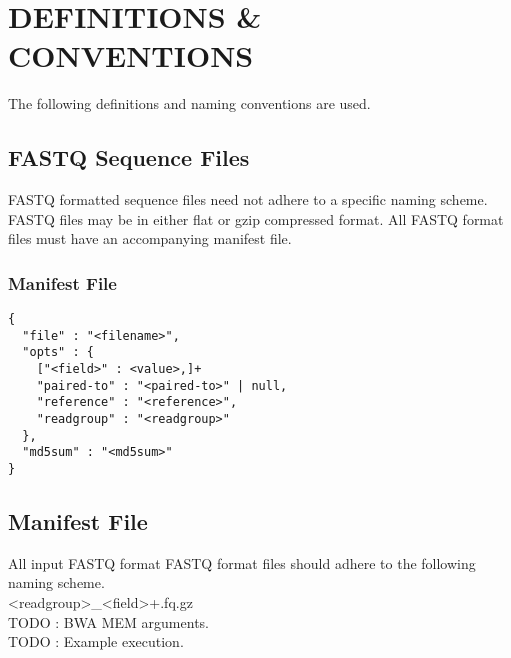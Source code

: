 \section{DEFINITIONS \& CONVENTIONS}
The following definitions and naming conventions are used.

\subsection{FASTQ Sequence Files}
FASTQ formatted sequence files need not adhere to a specific naming scheme.
FASTQ files may be in either flat or gzip compressed format.
All FASTQ format files must have an accompanying manifest file.

\subsubsection{Manifest File}
\begin{verbatim}
{
  "file" : "<filename>",
  "opts" : {
    ["<field>" : <value>,]+
    "paired-to" : "<paired-to>" | null,
    "reference" : "<reference>",
    "readgroup" : "<readgroup>"
  },
  "md5sum" : "<md5sum>"
}
\end{verbatim}

\subsection{Manifest File}
All input FASTQ format 
FASTQ format files should adhere to the following naming scheme. \\
\textless{readgroup}\textgreater\lbrack\_\textless{field}\textgreater\rbrack+.fq.gz \\

TODO : BWA MEM arguments. \\ 
TODO : Example execution. \\ 

